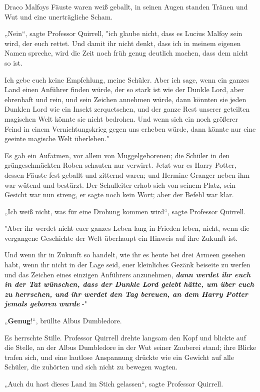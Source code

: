 {Draco Malfoys Fäuste waren weiß geballt, in seinen Augen standen Tränen und Wut und eine unerträgliche Scham.

„Nein“, sagte Professor Quirrell, "ich glaube nicht, dass es Lucius Malfoy sein wird, der euch rettet. Und damit ihr nicht denkt, dass ich in meinem eigenen Namen spreche, wird die Zeit noch früh genug deutlich machen, dass dem nicht so ist.

Ich gebe euch keine Empfehlung, meine Schüler. Aber ich sage, wenn ein ganzes Land einen Anführer finden würde, der so stark ist wie der Dunkle Lord, aber ehrenhaft und rein, und sein Zeichen annehmen würde, dann könnten sie jeden Dunklen Lord wie ein Insekt zerquetschen, und der ganze Rest unserer geteilten magischen Welt könnte sie nicht bedrohen. Und wenn sich ein noch größerer Feind in einem Vernichtungskrieg gegen uns erheben würde, dann könnte nur eine geeinte magische Welt überleben."

Es gab ein Aufatmen, vor allem von Muggelgeborenen; die Schüler in den grüngeschmückten Roben schauten nur verwirrt. Jetzt war es Harry Potter, dessen Fäuste fest geballt und zitternd waren; und Hermine Granger neben ihm war wütend und bestürzt. Der Schulleiter erhob sich von seinem Platz, sein Gesicht war nun streng, er sagte noch kein Wort; aber der Befehl war klar.

„Ich weiß nicht, was für eine Drohung kommen wird“, sagte Professor Quirrell.

"Aber ihr werdet nicht euer ganzes Leben lang in Frieden leben, nicht, wenn die vergangene Geschichte der Welt überhaupt ein Hinweis auf ihre Zukunft ist.

Und wenn ihr in Zukunft so handelt, wie ihr es heute bei drei Armeen gesehen habt, wenn ihr nicht in der Lage seid, euer kleinliches Gezänk beiseite zu werfen und das Zeichen eines einzigen Anführers anzunehmen, \textbf{\emph{dann werdet ihr euch in der Tat wünschen, dass der Dunkle Lord gelebt hätte, um über euch zu herrschen, und ihr werdet den Tag bereuen, an dem Harry Potter jemals geboren wurde}} -"

„\textbf{Genug}!“, brüllte Albus Dumbledore.

Es herrschte Stille. Professor Quirrell drehte langsam den Kopf und blickte auf die Stelle, an der Albus Dumbledore in der Wut seiner Zauberei stand; ihre Blicke trafen sich, und eine lautlose Anspannung drückte wie ein Gewicht auf alle Schüler, die zuhörten und sich nicht zu bewegen wagten.

„Auch du hast dieses Land im Stich gelassen“, sagte Professor Quirrell.

}
